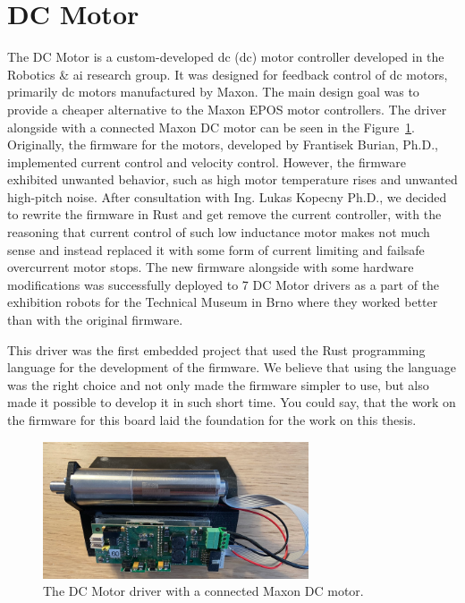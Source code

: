 \section{DC Motor}
\label{sec:dcmotor}
The DC Motor is a custom-developed \acs{dc} (\acl{dc}) motor controller developed in the Robotics \& \acs{ai} research group.
It was designed for feedback control of \acs{dc} motors, primarily \acs{dc} motors manufactured by Maxon.
The main design goal was to provide a cheaper alternative to the Maxon EPOS motor controllers.
The driver alongside with a connected Maxon DC motor can be seen in the Figure~\ref{fig:dcmotor}.
Originally, the firmware for the motors, developed by Frantisek Burian, Ph.D., implemented current control and velocity control.
However, the firmware exhibited unwanted behavior, such as high motor temperature rises and unwanted high-pitch noise.
After consultation with Ing. Lukas Kopecny Ph.D., we decided to rewrite the firmware in Rust and get remove the current controller, with the reasoning that current control of such low inductance motor makes not much sense and instead replaced it with some form of current limiting and failsafe overcurrent motor stops.
The new firmware alongside with some hardware modifications was successfully deployed to 7 DC Motor drivers as a part of the exhibition robots for the Technical Museum in Brno where they worked better than with the original firmware.

This driver was the first embedded project that used the Rust programming language for the development of the firmware.
We believe that using the language was the right choice and not only made the firmware simpler to use, but also made it possible to develop it in such short time.
You could say, that the work on the firmware for this board laid the foundation for the work on this thesis.

\begin{figure}[H]
    \centering
    \includegraphics[width=0.7\textwidth]{obrazky/dcmotor}
    \caption{The DC Motor driver with a connected Maxon DC motor.}
    \label{fig:dcmotor}
\end{figure}

